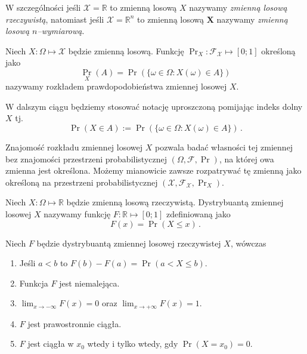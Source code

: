 \documentclass{myclass}
\numberwithin{equation}{subsection}
\begin{document}
W szczególności jeśli \(\mathcal{X} = \mathbb{R}\) to zmienną losową \(X\) nazywamy \emph{zmienną
losową rzeczywistą}, natomiast jeśli \(\mathcal{X} = \mathbb{R}^n\) to zmienną losową \(\bm{X}\)
nazywamy \emph{zmienną losową \(n\)--wymiarową}.

\begin{definition}
Niech \(X: \Omega \mapsto \mathcal{X}\) będzie zmienną losową. Funkcję \(\Pr_X:
\mathcal{F}_\mathcal{X}\mapsto [0;1]\) określoną jako
\begin{equation*}
    {\Pr_{X}} (A) = \Pr(\{\omega \in \Omega : X(\omega) \in A\})
\end{equation*}
nazywamy rozkładem prawdopodobieństwa zmiennej losowej \(X\).
\end{definition}

W dalszym ciągu będziemy stosować notację uproszczoną pomijając indeks dolny \(X\) tj.
\begin{equation*}
    \Pr(X \in A) := \Pr(\{\omega \in \Omega : X(\omega) \in A\})\,.
\end{equation*}

Znajomość rozkładu zmiennej losowej \(X\) pozwala badać własności tej zmiennej bez znajomości
przestrzeni probabilistycznej \((\Omega, \mathcal{F}, \Pr)\), na której owa zmienna jest określona.
Możemy mianowicie zawsze rozpatrywać tę zmienną jako określoną na przestrzeni probabilistycznej
\((\mathcal{X}, \mathcal{F}_\mathcal{X}, \Pr_X)\).

\begin{definition}
Niech \(X: \Omega \mapsto \mathbb{R}\) będzie zmienną losową rzeczywistą. Dystrybuantą zmiennej
losowej \(X\) nazywamy funkcję \(F: \mathbb{R} \mapsto [0;1]\) zdefiniowaną jako
\begin{equation*}
    F(x) = \Pr(X \leq x)\,.
\end{equation*}
\end{definition}

\begin{theorem}
Niech \(F\) będzie dystrybuantą zmiennej losowej rzeczywistej \(X\), wówczas
\begin{enumerate}
    
    \item Jeśli \(a < b\) to \(F(b) - F(a) = \Pr( a < X \leq b )\).
    
    \item Funkcja \(F\) jest niemalejąca.

    \item \(\lim_{x \to -\infty} F(x) = 0\) oraz \(\lim_{x \to +\infty} F(x) = 1\).

    \item \(F\) jest prawostronnie ciągła.

    \item \(F\) jest ciągła w \(x_0\) wtedy i tylko wtedy, gdy \(\Pr(X = x_0) = 0\).

\end{enumerate}
\end{theorem}
\end{document}

